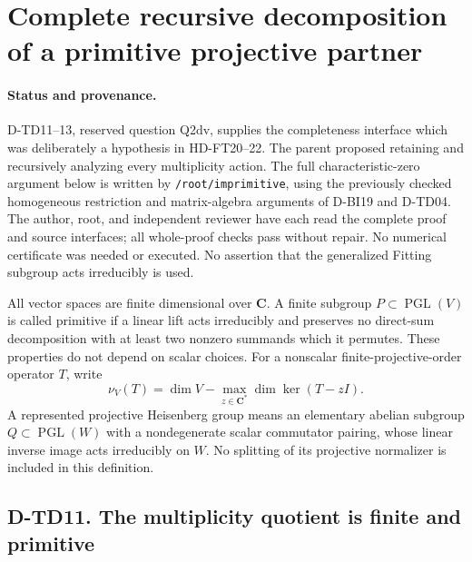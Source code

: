 \section{Complete recursive decomposition of a primitive projective partner}
\label{sec:recursive-primitive-partner}

\paragraph{Status and provenance.}
D-TD11--13, reserved question Q2dv, supplies the completeness interface
which was deliberately a hypothesis in HD-FT20--22.  The parent proposed
retaining and recursively analyzing every multiplicity action.  The full
characteristic-zero argument below is written by
\texttt{/root/imprimitive}, using the previously checked homogeneous
restriction and matrix-algebra arguments of D-BI19 and D-TD04.
The author, root, and independent reviewer have each read the complete proof and source interfaces; all whole-proof checks pass without repair. No numerical certificate was needed or executed.
No assertion that the
generalized Fitting subgroup acts irreducibly is used.

All vector spaces are finite dimensional over $\mathbf C$.  A finite
subgroup $P\subset\operatorname{PGL}(V)$ is called primitive if a linear
lift acts irreducibly and preserves no direct-sum decomposition with
at least two nonzero summands which it permutes.  These properties do
not depend on scalar choices.  For a nonscalar finite-projective-order
operator $T$, write
\[
 \nu_V(T)=\dim V-\max_{z\in\mathbf C^*}\dim\ker(T-zI).
 \tag{TDR.1}
\]
A represented projective Heisenberg group means an elementary abelian
subgroup $Q\subset\operatorname{PGL}(W)$ with a nondegenerate scalar
commutator pairing, whose linear inverse image acts irreducibly on $W$.
No splitting of its projective normalizer is included in this definition.

\subsection*{D-TD11. The multiplicity quotient is finite and primitive}


